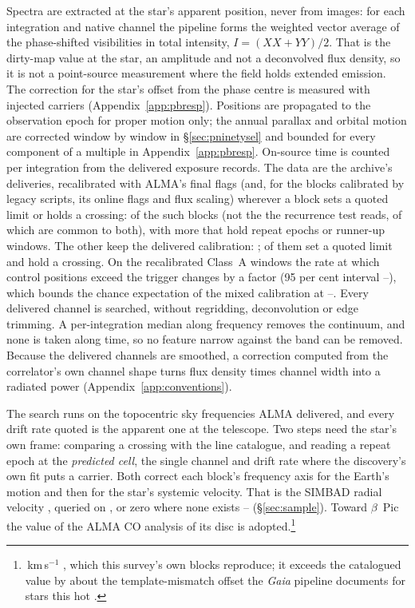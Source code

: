 Spectra are extracted at the star's apparent position, never from images: for
each integration and native channel the pipeline forms the weighted vector
average of the phase-shifted visibilities in total intensity,
$I=(XX+YY)/2$. That is the dirty-map value at the star, an amplitude and not a
deconvolved flux density, so it is not a point-source measurement where the
field holds extended emission. The correction for the star's offset from the
phase centre is measured with injected carriers (Appendix~\ref{app:pbresp}).
Positions are propagated to the observation epoch for proper motion only; the
annual parallax and orbital motion are corrected window by window in
\S\ref{sec:pninetysel} and bounded for every component of a multiple in
Appendix~\ref{app:pbresp}. On-source time is counted per integration from the
delivered exposure records.
%
The data are the archive's deliveries, recalibrated with ALMA's final flags
(and, for the \RflNEbLegacyWord{} blocks calibrated by legacy scripts, its online
flags and flux scaling) wherever a block sets a quoted limit or holds a
crossing: \RflNEbCore{} of the \RflNEbCoreAll{} such blocks (not the
\ZcNRecEB{} the recurrence test reads, \RflNEbCoreRecBoth{} of which are
common to both), with
\RflNEbExtra{} more that hold repeat epochs or runner-up windows. The other
\RflNEbNot{} keep the delivered calibration: \RflNotClause; \RflNNotLim{} of
them set a quoted limit and
\RflNNotCross{} hold a crossing. On the \RflChNWin{} recalibrated Class~A
windows the rate at which control positions exceed the trigger changes by a
factor \RflChRatio{} (95 per cent interval \RflChLo--\RflChHi), which bounds the
chance expectation of the mixed calibration at \RflCeLo--\RflCeHi.
%
Every delivered channel is searched, without regridding, deconvolution or
edge trimming. A per-integration median along frequency removes the
continuum, and none is taken along time, so no feature narrow against the band
can be removed. Because the delivered channels are smoothed, a correction
computed from the correlator's own channel shape turns flux density times
channel width into a radiated power (Appendix~\ref{app:conventions}).

The search runs on the topocentric sky frequencies ALMA delivered, and every
drift rate quoted is the apparent one at the telescope. Two steps need the
star's own frame: comparing a crossing with the line catalogue, and reading a
repeat epoch at the \emph{predicted cell}, the single channel and drift rate
where the discovery's own fit puts a carrier. Both correct each block's
frequency axis for the Earth's motion and then for the star's systemic
velocity. That is the SIMBAD radial velocity \citep{SIMBAD2000}, queried on
\SimbadQueryDate, or zero where none exists -- \FrZeroVsysClause{}
(\S\ref{sec:sample}). Toward $\beta$~Pic the value of the ALMA CO analysis of
its disc is adopted.\footnote{\BpRecVsys\,km\,s$^{-1}$ \citep{Matra2017},
which this survey's own blocks reproduce; it exceeds the catalogued value by
about the template-mismatch offset the \textit{Gaia} pipeline documents for
stars this hot \citep{Blomme2023}.}

